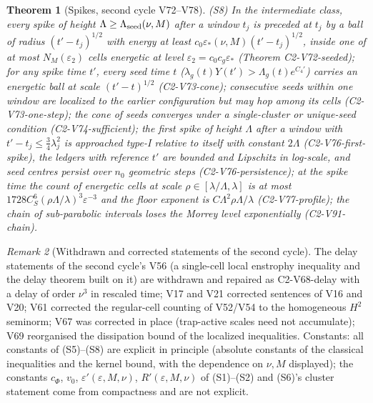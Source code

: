 \documentclass[11pt]{article}
\theoremstyle{plain}
\newtheorem{theorem}{Theorem}[section]
\theoremstyle{definition}
\theoremstyle{remark}
\newtheorem{remark}[theorem]{Remark}
\begin{document}
\begin{theorem}[Spikes, second cycle V72--V78]
\label{thm:c4v1-spikes}
(S8) In the intermediate class, every spike of height
\(\Lambda\ge\Lambda_{\rm seed}(\nu,M)\) after a window \(t_j\) is preceded at \(t_j\) by a
ball of radius \((t'-t_j)^{1/2}\) with energy at least \(c_0\varepsilon_*(\nu,M)(t'-t_j)^{1/2}\),
inside one of at most \(N_M(\varepsilon_2)\) cells energetic at level
\(\varepsilon_2=c_0c_g\varepsilon_*\) (Theorem C2-V72-seeded); for any spike time
\(t'\), every seed time \(t\) (\(\lambda_g(t)Y(t')>\Lambda_g(t)e^{C_4'}\)) carries an
energetic ball at scale \((t'-t)^{1/2}\) (C2-V73-cone); consecutive
seeds within one window are localized to the earlier configuration
but may hop among its cells (C2-V73-one-step); the cone of seeds
converges under a single-cluster or unique-seed condition
(C2-V74-sufficient); the first spike of height \(\Lambda\) after a window
with \(t'-t_j\le\frac34\lambda_j^2\) is approached type-I relative to itself
with constant \(2\Lambda\) (C2-V76-first-spike), the ledgers with reference
\(t'\) are bounded and Lipschitz in log-scale, and seed centres persist
over \(n_0\) geometric steps (C2-V76-persistence); at the spike time the
count of energetic cells at scale \(\rho\in[\lambda/\Lambda,\lambda]\) is at most
\(1728C_S^6(\rho\Lambda/\lambda)^3\varepsilon^{-3}\) and the floor exponent is
\(C\Lambda^2\rho\Lambda/\lambda\) (C2-V77-profile); the chain of sub-parabolic
intervals loses the Morrey level exponentially (C2-V91-chain).
\end{theorem}

\begin{remark}[Withdrawn and corrected statements of the second cycle]
\label{rem:c4v1-corrections}
The delay statements of the second cycle's V56 (a single-cell local
enstrophy inequality and the delay theorem built on it) are withdrawn
and repaired as C2-V68-delay with a delay of order \(\nu^3\) in rescaled
time; V17 and V21 corrected sentences of V16 and V20; V61 corrected
the regular-cell counting of V52/V54 to the homogeneous \(H^2\)
seminorm; V67 was corrected in place (trap-active scales need not
accumulate); V69 reorganised the dissipation bound of the localized
inequalities.  Constants: all constants of (S5)--(S8) are explicit in
principle (absolute constants of the classical inequalities and the
kernel bound, with the dependence on \(\nu,M\) displayed); the
constants \(c_\Phi\), \(v_0\), \(\varepsilon'(\varepsilon,M,\nu)\), \(R'(\varepsilon,M,\nu)\) of
(S1)--(S2) and (S6)'s cluster statement come from compactness and are
not explicit.
\end{remark}
\end{document}
